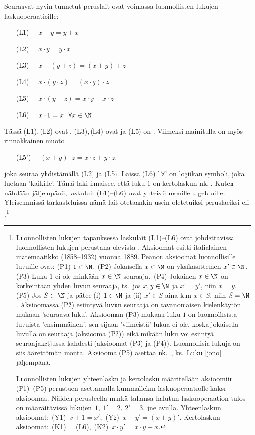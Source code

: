 Seuraavat hyvin tunnetut peruslait ovat voimassa luonnollisten lukujen laskuoperaatioille:
\begin{itemize}
\item[(L1)] $\quad x+y = y+x$
\item[(L2)] $\quad x \cdot y = y \cdot x$
\item[(L3)] $\quad x+(y+z) = (x+y)+z$
\item[(L4)] $\quad x \cdot (y \cdot z) = (x \cdot y) \cdot z$
\item[(L5)] $\quad x \cdot (y+z) = x \cdot y + x \cdot z$
\item[(L6)] $\quad x \cdot 1 = x \ \ \forall x \in \N$
\end{itemize}
Tässä (L1),\,(L2) ovat , (L3),\,(L4) ovat  ja (L5) on 
. Viimeksi mainitulla on myös rinnakkainen muoto
\begin{itemize}
\item[(L5')] $\quad\!\! (x+y) \cdot z = x \cdot z + y \cdot z$,
\end{itemize}
joka seuraa yhdistämällä (L2) ja (L5). Laissa (L6) '$\,\forall$' on logiikan symboli, joka 
luetaan 'kaikille'. Tämä laki ilmaisee, että luku  $1$ on kertolaskun nk. . 
Kuten nähdään jäljempänä, laskulait (L1)--(L6) ovat yhteisiä monille algebroille. Yleisemmissä tarkasteluissa
nämä lait otetaankin usein oletetuiksi peruslaeiksi eli .\footnote[2]{Luonnollisten lukujen 
tapauksessa laskulait (L1)--(L6) ovat johdettavissa luonnollisten lukujen perustana olevista
. Aksioomat esitti italialainen matemaatikko  (1858--1932) vuonna
1889. Peanon aksioomat luonnollisille luvuille ovat: (P1) $1\in\N$. \,(P2) Jokaisella $x\in\N$ on yksikäsitteinen
 $x'\in\N$. \,(P3) Luku $1$ ei ole minkään $x\in\N$ seuraaja. \,(P4) Jokainen $x\in\N$ on
korkeintaan yhden luvun seuraaja, ts.\ jos $x,y\in\N$ ja $x'=y'$, niin $x=y$. \,(P5) Jos $S\subset\N$ ja pätee
(i) $1\in\N$ ja (ii) $x' \in S$ aina kun $x \in S$, niin $S=\N$. Aksioomassa (P2) esiintyvä luvun seuraaja on 
tavanomaisen kielenkäytön mukaan 'seuraava luku'. Aksiooman (P3) mukaan luku $1$ on luonnollisista luvuista
'ensimmäinen', sen sijaan 'viimeistä' lukua ei ole, koska jokaisella luvulla on seuraaja (aksiooma (P2)) eikä 
mikään luku voi esiintyä seuraajaketjussa kahdesti (aksioomat (P3) ja (P4)). Luonnollisia lukuja on siis
äärettömän monta. Aksiooma (P5) asettaa nk.\ , ks.\ Luku \ref{jono} jäljempänä. 

Luonnollisten lukujen yhteenlasku ja kertolasku määritellään aksioomiin (P1)--(P5) perustuen asettamalla
kummallekin laskuoperaatiolle kaksi aksioomaa. Näiden perusteella minkä tahansa halutun laskuoperaation tulos
on määrättävissä lukujen $\,1$, $1' = 2$, $2' = 3$, jne avulla. Yhteenlaskun aksioomat: \,(Y1) $\,x+1=x'$, 
\,(Y2) $\,x+y'=(x+y)'$. Kertolaskun aksioomat: \,(K1) = (L6), \,(K2) $\,x \cdot y' = x \cdot y + x$.}

